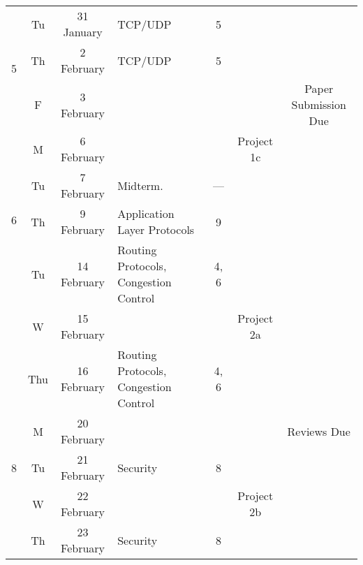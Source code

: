 \documentclass[11pt]{article}
\begin{document}
\begin{sidewaystable}
\begin{tabular}{|c|cc||p{8cm}|c|c|c|}
\multirow{3}{*}{5}  
                    & Tu & 31 January & TCP/UDP                          & 5 & \cellcolor[gray]{0.9}  & \cellcolor[gray]{0.9} \\\cline{2-6}
                    & Th & 2 February & TCP/UDP                              & 5 & \cellcolor[gray]{0.9}  & \cellcolor[gray]{0.9} \\\cline{2-6}
                    & F & 3 February & \cellcolor[gray]{0.9} & \cellcolor[gray]{0.9} &  \cellcolor[gray]{0.9} & Paper Submission Due\\\hline\hline

\multirow{4}{*}{6}  & M & 6 February & \cellcolor[gray]{0.9} & \cellcolor[gray]{0.9} &  Project 1c & \cellcolor[gray]{0.9} \\\cline{2-6}
                    & Tu & 7 February  & Midterm.        & --- & \cellcolor[gray]{0.9}  & \cellcolor[gray]{0.9} \\\cline{2-6}
                    & Th & 9 February  & Application Layer Protocols                         & 9 & \cellcolor[gray]{0.9}  & \cellcolor[gray]{0.9} \\\hline\hline

\multirow{3}{*}{7}  & Tu & 14 February   & Routing Protocols, Congestion Control                                & 4, 6 & \cellcolor[gray]{0.9} & \cellcolor[gray]{0.9} \\\cline{2-6}
                    & W & 15 February  & \cellcolor[gray]{0.9} & \cellcolor[gray]{0.9} & Project 2a & \cellcolor[gray]{0.9} \\\cline{2-6}
                    & Thu & 16 February   & Routing Protocols, Congestion Control                                & 4, 6 & \cellcolor[gray]{0.9}  & \cellcolor[gray]{0.9} \\\hline\hline

\multirow{3}{*}{8}  & M & 20 February    & \cellcolor[gray]{0.9} & \cellcolor[gray]{0.9} &  \cellcolor[gray]{0.9} & Reviews Due \\\cline{2-7}
                    & Tu & 21 February   & Security                                & 8 & \cellcolor[gray]{0.9}  & \cellcolor[gray]{0.9} \\\cline{2-6}
                    & W & 22 February  & \cellcolor[gray]{0.9} & \cellcolor[gray]{0.9} & Project 2b & \cellcolor[gray]{0.9} \\\cline{2-6}
                    & Th & 23 February   & Security           & 8 & \cellcolor[gray]{0.9}  & \cellcolor[gray]{0.9} \\\hline\hline


\end{tabular}
\end{sidewaystable}
\end{document}
